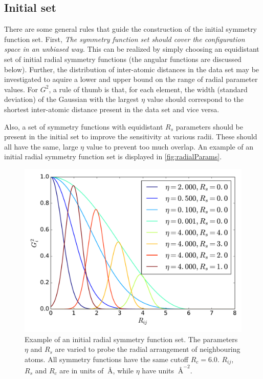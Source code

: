 \documentclass[twoside,english]{uiofysmaster}
\begin{document}
\subsection{Initial set} \label{sec:initialSymmSet}
There are some general rules that guide the construction of the initial symmetry function set.
First, \textit{The symmetry function set should cover the configuration space in an unbiased way}.
This can be realized by simply choosing an equidistant set of initial radial symmetry functions (the angular
functions are discussed below). Further, the distribution of inter-atomic distances in the data set may be investigated to aquire a 
lower and upper bound on the range of radial parameter values. For $G^2$, a rule of thumb is that, for each element, 
the width (standard deviation) of the Gaussian
with the largest $\eta$ value should correspond to the shortest inter-atomic distance present in the data set 
and vice versa. 

Also, a set of symmetry functions with equidistant $R_s$ parameters should be present in the initial set to improve 
the sensitivity at various radii. 
These should all have the same, large $\eta$ value to prevent too much overlap. 
An example of an initial radial symmetry function set is displayed
in \autoref{fig:radialParams}. 
\begin{figure}
\centering
  \includegraphics[width = 0.7\linewidth]{Figures/Implementation/radialParams.pdf}
  \caption{Example of an initial radial symmetry function set. The parameters $\eta$ and $R_s$ are varied to 
  probe the radial arrangement of neighbouring atoms.
  All symmetry functions have the same cutoff $R_c = 6.0$. 
  $R_{ij}$, $R_s$ and $R_c$ are in units of $\SI{}{\angstrom}$, while $\eta$ have units $\SI{}{\angstrom}^{-2}$.}
  \label{fig:radialParams}
\end{figure}
\end{document}
